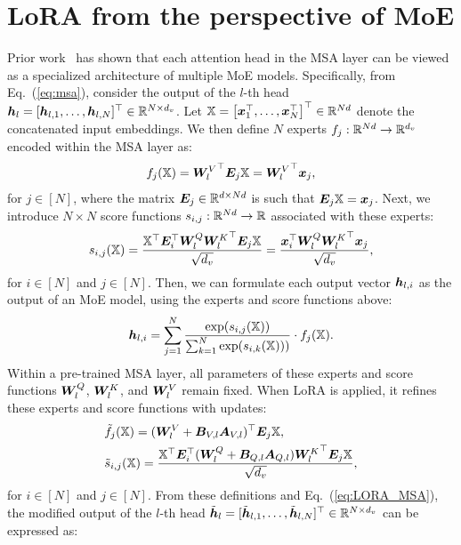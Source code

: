\section{LoRA from the perspective of MoE}
\label{sec:MoE-LoRA}

Prior work~\cite{moeprompt, prefixmoe} has shown that each attention head in the MSA layer can be viewed as a specialized architecture of multiple MoE models. Specifically, from Eq.~(\ref{eq:msa}), consider the output of the $l$-th head ${\bm h}_l = [{\bm h}_{l, 1}, \dots, {\bm h}_{l, N}]^\top \in \mathbb{R}^{N \times d_v}$. Let $\mathbb{X} = \left[{\bm x}_1^\top,\dots,{\bm x}_N^\top\right]^\top \in \mathbb{R}^{Nd}$ denote the concatenated input embeddings. We then define $N$ experts $f_j: \mathbb{R}^{Nd} \rightarrow \mathbb{R}^{d_v}$ encoded within the MSA layer as:
\begin{align}
    f_j(\mathbb{X}) = {\bm{W}_l^V}^\top {\bm E}_{j} \mathbb{X} = {\bm{W}_l^V}^\top {\bm x}_j,
\end{align}
for $j \in [N]$, where the matrix ${\bm E}_{j} \in \mathbb{R}^{d \times Nd}$ is such that ${\bm E}_{j} \mathbb{X} = {\bm x}_{j}$. Next, we introduce $N \times N$ score functions $s_{i, j}: \mathbb{R}^{Nd} \rightarrow \mathbb{R}$ associated with these experts:
\begin{align}
    s_{i,j}(\mathbb{X}) 
    = \frac{\mathbb{X}^\top {\bm E}_{i}^{\top} \bm{W}_l^Q {\bm{W}_l^K}^\top {\bm E}_{j} \mathbb{X}}{\sqrt{d_{v}}}
    = \frac{{\bm x}_{i}^{\top} \bm{W}_l^Q {\bm{W}_l^K}^\top {\bm x}_{j}}{\sqrt{d_{v}}},
\end{align}
for $i \in [N]$ and $j \in [N]$. Then, we can formulate each output vector ${\bm h}_{l, i}$ as the output of an MoE model, using the experts and score functions above:
\begin{align}
{\bm h}_{l, i}
= \sum_{j = 1}^N  
    \frac{\exp(s_{i, j}(\mathbb{X}))}
    {
        \sum_{k = 1}^N \exp(s_{i, k}(\mathbb{X}))) 
    } \cdot f_j(\mathbb{X}).
\end{align}
Within a pre-trained MSA layer, all parameters of these experts and score functions $\bm{W}_l^Q$, $\bm{W}_l^K$, and $\bm{W}_l^V$ remain fixed. When LoRA is applied, it refines these experts and score functions with updates:
\begin{align}
    &\tilde{f}_j(\mathbb{X}) = (\bm{W}_l^V + {\bm B}_{V,l}{\bm A}_{V,l})^\top {\bm E}_{j} \mathbb{X}, \\
    &\tilde{s}_{i,j}(\mathbb{X}) = \frac{\mathbb{X}^\top {\bm E}_{i}^{\top} (\bm{W}_l^Q + {\bm B}_{Q,l}{\bm A}_{Q,l}) {\bm{W}_l^K}^\top {\bm E}_{j} \mathbb{X}}{\sqrt{d_{v}}},
\end{align}
for $i \in [N]$ and $j \in [N]$. From these definitions and Eq.~(\ref{eq:LORA_MSA}), the modified output of the $l$-th head $\tilde{{\bm h}}_l = [\tilde{{\bm h}}_{l, 1}, \dots, \tilde{{\bm h}}_{l, N}]^\top \in \mathbb{R}^{N \times d_v}$ can be expressed as:
